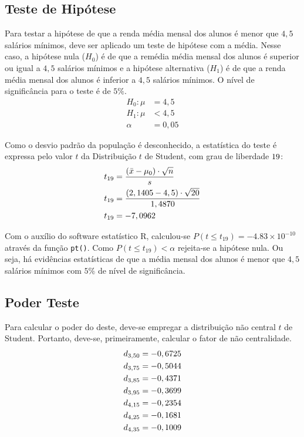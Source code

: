 

\subsection{Teste de Hipótese}

	Para testar a hipótese de que a renda média mensal dos alunos é menor
	que $4,5$ salários mínimos, deve ser aplicado um teste de hipótese com a
	média. Nesse caso, a hipótese nula ($H_0$) é de que a remédia média mensal dos
	alunos é superior ou igual a $4,5$ salários mínimos e a hipótese alternativa
	($H_1$) é de que a renda média mensal dos alunos é inferior a $4,5$ salários
	mínimos. O nível de significância para o teste é de $5\%$.
	\begin{align*}
		H_0: \mu &= 4,5\\
		H_1: \mu &< 4,5   \\
		     \alpha &= 0,05
	\end{align*}

	Como o desvio padrão da população é desconhecido, a estatística do
	teste é expressa pelo valor $t$ da Distribuição $t$ de Student, com grau de
	liberdade $19$:
	\begin{align*}
		t_{19} &= \frac{(\bar{x} - \mu_0)\cdot\sqrt{n}}{s} \\
		t_{19} &= \dfrac{(2,1405 - 4,5) \cdot \sqrt{20}}{1,4870} \\
		t_{19} &= -7,0962
	\end{align*}

	Com o auxílio do software estatístico R, calculou-se $P(t  \leq t_{19})
	= -4.83\times 10^{-10}$ através da função \texttt{pt()}. Como $P(t  \leq
	t_{19}) < \alpha$ rejeita-se a hipótese nula. Ou seja, há evidências
	estatísticas de que a média mensal dos alunos é menor que $4,5$ salários
	mínimos com $5\%$ de nível de significância.

\subsection{Poder Teste}

	Para calcular o poder do deste, deve-se empregar a distribuição não
	central $t$ de Student. Portanto, deve-se, primeiramente, calcular o fator de
	não centralidade.
	\begin{align*}
		d_{3,50} &= -0,6725\\
		d_{3,75} &= -0,5044\\
		d_{3,85} &= -0,4371\\
		d_{3,95} &= -0,3699\\
		d_{4,15} &= -0,2354\\
		d_{4,25} &= -0,1681\\
		d_{4,35} &= -0,1009\\
	\end{align*}

